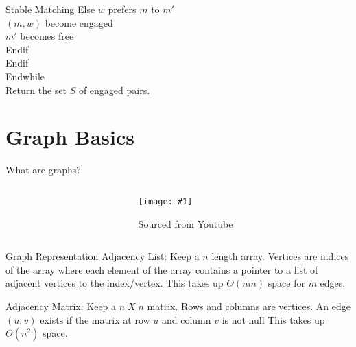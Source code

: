 \documentclass{beamer}
\newcommand{\defineFigure}[4]{
    \begin{figure}[h]
        \centering
        \texttt{[image: \#1]}
        \caption{#3}
        \label{fig:#4}
    \end{figure}
}
\begin{document}
\begin{frame}{Stable Matching}
{{                \hspace{2cm}Else $w$ prefers $m$ to $m'$\\
                \hspace{3cm}$(m, w)$ become engaged\\
                \hspace{3cm}$m'$ becomes free\\
                \hspace{2cm}Endif\\
                \hspace{1cm}Endif\\
                Endwhile\\
                Return the set $S$ of engaged pairs.
            }
        }
    \end{frame}
    \section{Graph Basics}
    \begin{frame}{What are graphs?}
        \begin{columns}
            \begin{column}{0.5\textwidth}
                \bigskip

                \bigskip

            \end{column}
            \begin{column}{0.5\textwidth}
                \defineFigure
                {Graph}{0.80}
                {Sourced from Youtube}{lookatthisgraph}
            \end{column}
        \end{columns}
    \end{frame}
    \begin{frame}{Graph Representation}
        Adjacency List: Keep a $n$ length array. Vertices are indices of the array where each element of the array 
        contains a pointer to a list of adjacent vertices to the index/vertex. 
        This takes up $\Theta(nm)$ space for $m$ edges.
        \bigskip

        Adjacency Matrix: Keep a $n\; X\; n$ matrix. Rows and columns are vertices. 
        An edge $(u,v)$ exists if the matrix at row $u$ and column $v$ 
        is not null This takes up $\Theta(n^2)$ space.
    \end{frame}
\end{document}

